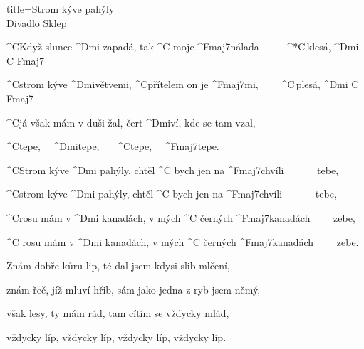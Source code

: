 \begin{song}{title=\predtitle\centering Strom kýve pahýly \\\large Divadlo Sklep \vspace*{-0.3cm}}  %
\begin{centerjustified}

\sloka
	^{C\z}Když slunce ^{Dmi \z}zapadá, tak ^{C \z}moje ^{\z Fmaj7}nálada~~~~~ ^*{\z C\,}klesá, ^{Dmi\,\,C\,\,Fmaj7}

	^{C\z}strom kýve ^{Dmi\z}větvemi, ^{C}přítelem on je ^{Fmaj7}mi,~~~~ ^{\z C\,}plesá, ^{Dmi\,\,C\,\,Fmaj7}

	^{C}já však mám v duši žal, čert ^{Dmi}ví, kde se tam vzal,

	^{C}tepe,~~ ^{\z Dmi}tepe,~~~ ^{C}tepe,~~ ^{\z Fmaj7}tepe.~~~~

	^{C\z}Strom kýve ^{Dmi \z}pahýly, chtěl ^{C \z}bych jen na ^{\z Fmaj7}chvíli~~~~~~ tebe,

	^{C\z}strom kýve ^{Dmi \z}pahýly, chtěl ^{C \z}bych jen na ^{\z Fmaj7}chvíli~~~~~~ tebe,

	^{C\z}rosu mám v ^{Dmi \z}kanadách, v mých ^{C \z}černých ^{\z Fmaj7}kanadách~~~~ zebe,

	^{C \z}rosu mám v ^{Dmi \z}kanadách, v mých ^{C \z}černých ^{\z Fmaj7}kanadách~~~~ zebe.


\sloka
	Znám dobře kůru lip, té dal jsem kdysi slib mlčení,

	znám řeč, jíž mluví hřib, sám jako jedna z ryb jsem němý,

	však lesy, ty mám rád, tam cítím se vždycky mlád,

	vždycky líp, vždycky líp, vždycky líp, vždycky líp.




\centering
{}

\end{centerjustified}
\setcounter{Slokočet}{0}
\end{song}
